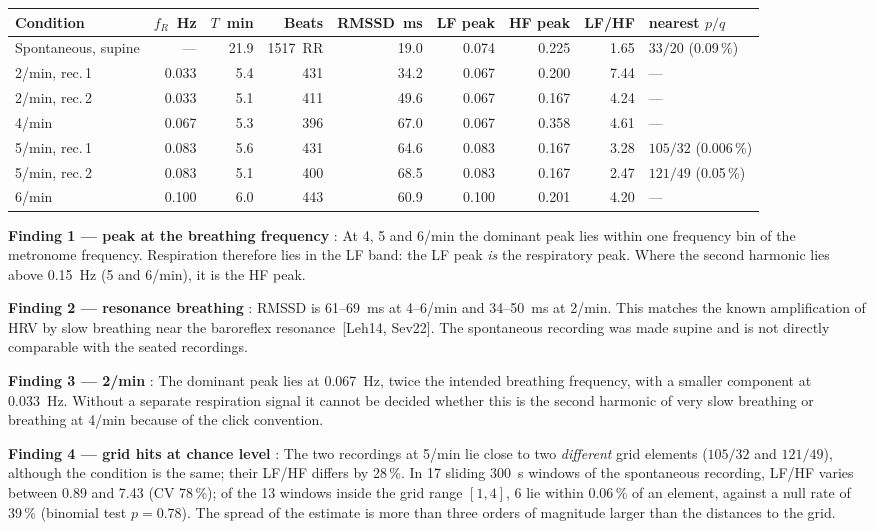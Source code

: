\begin{center}
\small
\begin{tabular}{@{}lrrrrrrrl@{}}
\toprule
Condition & $f_R$~Hz & $T$~min & Beats & RMSSD~ms & LF peak & HF peak & LF/HF & nearest $p/q$ \\
\midrule
Spontaneous, supine & --- & 21.9 & 1517~RR & 19.0 & 0.074 & 0.225 & 1.65 & $33/20$ (0.09\,\%) \\
2/min, rec.\,1 & 0.033 & 5.4 & 431 & 34.2 & 0.067 & 0.200 & 7.44 & --- \\
2/min, rec.\,2 & 0.033 & 5.1 & 411 & 49.6 & 0.067 & 0.167 & 4.24 & --- \\
4/min & 0.067 & 5.3 & 396 & 67.0 & 0.067 & 0.358 & 4.61 & --- \\
5/min, rec.\,1 & 0.083 & 5.6 & 431 & 64.6 & 0.083 & 0.167 & 3.28 & $105/32$ (0.006\,\%) \\
5/min, rec.\,2 & 0.083 & 5.1 & 400 & 68.5 & 0.083 & 0.167 & 2.47 & $121/49$ (0.05\,\%) \\
6/min & 0.100 & 6.0 & 443 & 60.9 & 0.100 & 0.201 & 4.20 & --- \\
\bottomrule
\end{tabular}
\end{center}


\textbf{Finding 1 --- peak at the breathing frequency} \KM: At 4, 5 and
6/min the dominant peak lies within one frequency bin of the metronome
frequency. Respiration therefore lies in the LF band: the LF peak
\emph{is} the respiratory peak. Where the second harmonic lies above
0.15~Hz (5 and 6/min), it is the HF peak.

\textbf{Finding 2 --- resonance breathing} \KM: RMSSD is 61--69~ms at
4--6/min and 34--50~ms at 2/min. This matches the known amplification of
HRV by slow breathing near the baroreflex resonance \LM\,[Leh14, Sev22].
The spontaneous recording was made supine and is not directly comparable
with the seated recordings.

\textbf{Finding 3 --- 2/min} \SM: The dominant peak lies at 0.067~Hz,
twice the intended breathing frequency, with a smaller component at
0.033~Hz. Without a separate respiration signal it cannot be decided
whether this is the second harmonic of very slow breathing or breathing
at 4/min because of the click convention.

\textbf{Finding 4 --- grid hits at chance level} \KM: The two recordings
at 5/min lie close to two \emph{different} grid elements ($105/32$ and
$121/49$), although the condition is the same; their LF/HF differs by
28\,\%. In 17 sliding 300~s windows of the spontaneous recording, LF/HF
varies between 0.89 and 7.43 (CV 78\,\%); of the 13 windows inside the
grid range $[1,4]$, 6 lie within 0.06\,\% of an element, against a null
rate of 39\,\% (binomial test $p=0.78$). The spread of the estimate is
more than three orders of magnitude larger than the distances to the grid.

